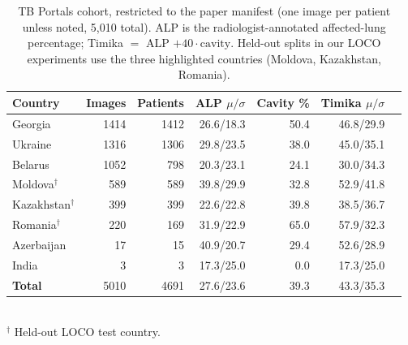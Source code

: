 \begin{table}[t]
\centering
\caption{TB Portals cohort, restricted to the paper manifest (one image per patient unless noted, 5{,}010 total).
ALP is the radiologist-annotated affected-lung percentage; Timika $=$ ALP $+ 40\cdot\text{cavity}$.
Held-out splits in our LOCO experiments use the three highlighted countries (Moldova, Kazakhstan, Romania).}
\label{tab:cohort}
\small
\begin{tabular}{lrrrrrr}
\toprule
Country & Images & Patients & ALP $\mu/\sigma$ & Cavity \% & Timika $\mu/\sigma$ \\
\midrule
Georgia & 1414 & 1412 & 26.6/18.3 & 50.4 & 46.8/29.9 \\
Ukraine & 1316 & 1306 & 29.8/23.5 & 38.0 & 45.0/35.1 \\
Belarus & 1052 & 798 & 20.3/23.1 & 24.1 & 30.0/34.3 \\
Moldova$^\dagger$ & 589 & 589 & 39.8/29.9 & 32.8 & 52.9/41.8 \\
Kazakhstan$^\dagger$ & 399 & 399 & 22.6/22.8 & 39.8 & 38.5/36.7 \\
Romania$^\dagger$ & 220 & 169 & 31.9/22.9 & 65.0 & 57.9/32.3 \\
Azerbaijan & 17 & 15 & 40.9/20.7 & 29.4 & 52.6/28.9 \\
India & 3 & 3 & 17.3/25.0 & 0.0 & 17.3/25.0 \\
\textbf{Total} & 5010 & 4691 & 27.6/23.6 & 39.3 & 43.3/35.3 \\
\bottomrule
\end{tabular}
\\[2pt]{\small $^\dagger$ Held-out LOCO test country.}
\end{table}
